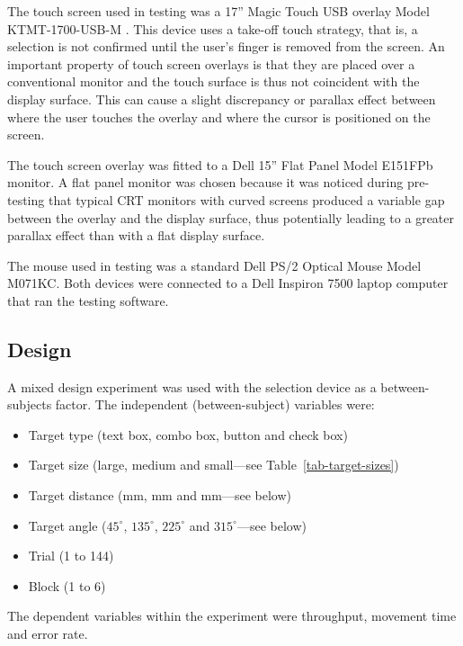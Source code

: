 \documentclass[a4paper]{article}
\begin{document}
The touch screen used in testing was a 17'' Magic Touch USB overlay
Model KTMT-1700-USB-M \citep{Keyt-2005-Touch}. This device uses a
take-off touch strategy, that is, a selection is not confirmed until the
user's finger is removed from the screen. An important property of touch
screen overlays is that they are placed over a conventional monitor and
the touch surface is thus not coincident with the display surface. This
can cause a slight discrepancy or parallax effect between where the user
touches the overlay and where the cursor is positioned on the screen.

The touch screen overlay was fitted to a Dell 15'' Flat Panel Model
E151FPb monitor. A flat panel monitor was chosen because it was noticed
during pre-testing that typical CRT monitors with curved screens
produced a variable gap between the overlay and the display surface,
thus potentially leading to a greater parallax effect than with a flat
display surface.

The mouse used in testing was a standard Dell PS/2 Optical Mouse Model
M071KC. Both devices were connected to a Dell Inspiron 7500 laptop
computer that ran the testing software.


\subsection{Design}
\label{sec-method-design}

A mixed design experiment was used with the selection device as a
between-subjects factor. The independent (between-subject) variables
were:
\begin{itemize}

	\item Target type (text box, combo box, button and check box)

	\item Target size (large, medium and small---see
	Table~\ref{tab-target-sizes})

	\item Target distance (\unit[40]{mm}, \unit[80]{mm} and
	\unit[160]{mm}---see below)

	\item Target angle (\(45^{\circ}\), \(135^{\circ}\), \(225^{\circ}\)
	and \(315^{\circ}\)---see below)

	\item Trial (1 to 144)

	\item Block (1 to 6)

\end{itemize}
The dependent variables within the experiment were throughput, movement
time and error rate.
\end{document}
